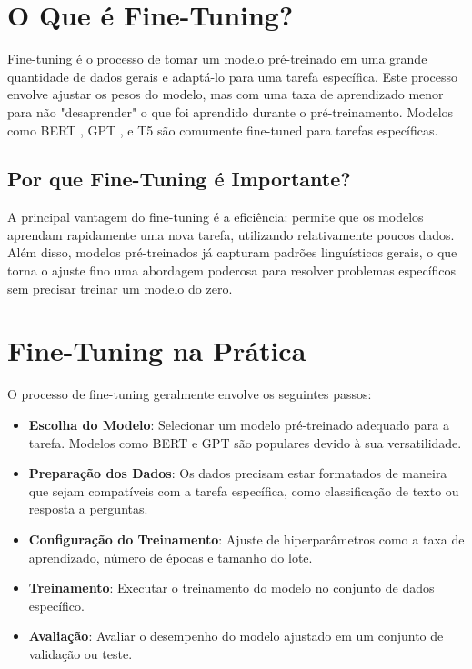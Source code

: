 \documentclass[14pt,a4paper,oneside]{book}
\begin{document}
\section{O Que é Fine-Tuning?}

Fine-tuning é o processo de tomar um modelo pré-treinado em uma grande quantidade de dados gerais e adaptá-lo para uma tarefa específica. Este processo envolve ajustar os pesos do modelo, mas com uma taxa de aprendizado menor para não "desaprender" o que foi aprendido durante o pré-treinamento. Modelos como BERT \cite{devlin2019bert}, GPT \cite{radford2019language}, e T5 \cite{raffel2020exploring} são comumente fine-tuned para tarefas específicas.

\subsection{Por que Fine-Tuning é Importante?}

A principal vantagem do fine-tuning é a eficiência: permite que os modelos aprendam rapidamente uma nova tarefa, utilizando relativamente poucos dados. Além disso, modelos pré-treinados já capturam padrões linguísticos gerais, o que torna o ajuste fino uma abordagem poderosa para resolver problemas específicos sem precisar treinar um modelo do zero.

\section{Fine-Tuning na Prática}

O processo de fine-tuning geralmente envolve os seguintes passos:

\begin{itemize}
	\item \textbf{Escolha do Modelo}: Selecionar um modelo pré-treinado adequado para a tarefa. Modelos como BERT e GPT são populares devido à sua versatilidade.
	\item \textbf{Preparação dos Dados}: Os dados precisam estar formatados de maneira que sejam compatíveis com a tarefa específica, como classificação de texto ou resposta a perguntas.
	\item \textbf{Configuração do Treinamento}: Ajuste de hiperparâmetros como a taxa de aprendizado, número de épocas e tamanho do lote.
	\item \textbf{Treinamento}: Executar o treinamento do modelo no conjunto de dados específico.
	\item \textbf{Avaliação}: Avaliar o desempenho do modelo ajustado em um conjunto de validação ou teste.
\end{itemize}
\end{document}
